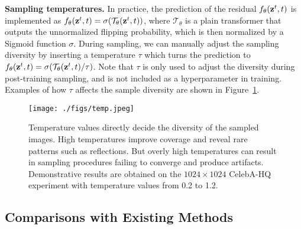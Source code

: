 \documentclass[10pt,twocolumn,letterpaper]{article}
\begin{document}
\noindent \textbf{Sampling temperatures.}
In practice, the prediction of the residual $f_\theta(\textbf{z}^t, t)$ is implemented as $f_\theta(\textbf{z}^t, t) = \sigma(\mathcal{T}_\theta(\textbf{z}^t, t))$, where $\mathcal{T}_\theta$ is a plain transformer that outputs the unnormalized flipping probability, which is then normalized by a Sigmoid function $\sigma$. During sampling, we can manually adjust the sampling diversity by inserting a temperature $\tau$ which turns the prediction to $f_\theta(\textbf{z}^t, t) = \sigma(\mathcal{T}_\theta(\textbf{z}^t, t) / \tau)$. Note that $\tau$ is only used to adjust the diversity during post-training sampling, and is not included as a hyperparameter in training. 
Examples of how $\tau$ affects the sample diversity are shown in Figure~\ref{fig:temp}.

\begin{figure}[t]
    \centering
	\texttt{[image: ./figs/temp.jpeg]}
    \caption{Temperature values directly decide the diversity of the sampled images. High temperatures improve coverage and reveal rare patterns such as reflections. But overly high temperatures can result in sampling procedures failing to converge and produce artifacts. Demonstrative results are obtained on the $1024 \times 1024$ CelebA-HQ experiment with temperature values from 0.2 to 1.2.}
\label{fig:temp}
\end{figure}


\subsection{Comparisons with Existing Methods}
\label{comp}
\end{document}
